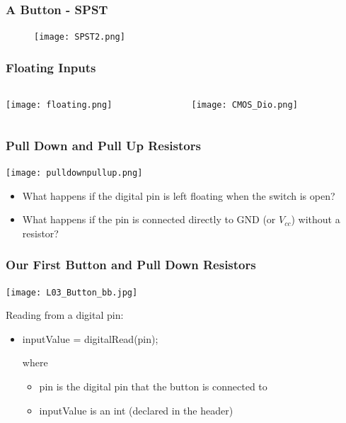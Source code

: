\documentclass{beamer}
\begin{document}
\begin{frame}\frametitle{A Button - SPST}
\begin{figure}[h]
	\texttt{[image: SPST2.png]}
\end{figure}
\end{frame}

\begin{frame}
\frametitle{Floating Inputs}
\begin{columns}
\begin{column}{5cm}
\begin{center}
	\texttt{[image: floating.png]}
\end{center}
\end{column}
\begin{column}{5cm}
\begin{figure}
	\texttt{[image: CMOS\_Dio.png]}
\end{figure}
\end{column}
\end{columns}
\end{frame}


\begin{frame}\frametitle{Pull Down and Pull Up Resistors}
\begin{center}
	\texttt{[image: pulldownpullup.png]}

\vspace{0.5cm}
\begin{itemize}
\item What happens if the digital pin is left floating when the switch is open?
\item What happens if the pin is connected directly to GND (or $V_{cc}$) without a resistor?
\end{itemize}
\end{center}
\end{frame}

\begin{frame}\frametitle{Our First Button and Pull Down Resistors}
\begin{center}
	\texttt{[image: L03\_Button\_bb.jpg]}
\end{center}
\vspace{0.25cm}
Reading from a digital pin:
\begin{itemize}
\item inputValue = digitalRead(pin);


where
	\begin{itemize}
	\item pin is the digital pin that the button is connected to
	\item inputValue is an int (declared in the header)
	\end{itemize}
\end{itemize}

\end{frame}
\end{document}

